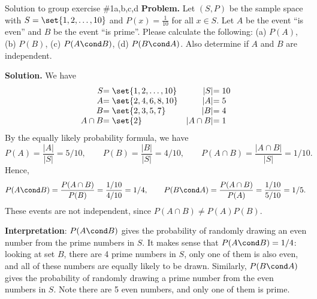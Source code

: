 \documentclass[10pt]{beamer}
\begin{document}
\begin{frame}{Solution to group exercise \#1a,b,c,d}
\footnotesize 
\vspace{-.1cm} 
\textbf{Problem.}  Let $(S,P)$ be the sample space with $S=\set{1,2,\hdots, 10}$ and $P(x) =\frac{1}{10}$ for all $x \in S$.  Let $A$ be the event \enquote{is even} and $B$ be the event \enquote{is prime}.  Please calculate the following: (a) $P(A)$,  (b) $P(B)$, (c) $P(A \cond B)$, (d) $P(B \cond A)$. Also determine if $A$ and $B$ are independent.

\vspace{-.135cm}
\textbf{Solution.}
We have 
\[
\begin{array}{r@{}l r@{}l}
S &= \set{1,2,\hdots, 10} & |S| &= 10 \\
A &= \set{2,4,6,8,10} & |A| &= 5 \\
B &= \set{2,3,5,7} & |B| &= 4 \\
A \cap B &= \set{2} & |A \cap B| &= 1
\end{array}
\]
%
By the equally likely probability formula, we have
 \[ P(A) = \frac{|A|}{|S|} = 5/10, \qquad P(B) = \frac{|B|}{|S|} = 4/10, \qquad P(A \cap B) =  \frac{|A \cap B|}{|S|} = 1/10. \]
Hence,
\[P(A \cond B) = \frac{P(A \cap B)}{P(B)} = \frac{1/10}{4/10} = 1/4, \qquad  P(B \cond A) = \frac{P(A \cap B)}{P(A)} = \frac{1/10}{5/10} = 1/5.\]
These events are not independent, since $P(A \cap B) \neq P(A) P(B).$

%
\vspace{-.135cm} 
\textbf{Interpretation}: $P(A \cond B)$ gives the probability of randomly drawing an even number from the prime numbers in $S$.  It makes sense that $P(A \cond B)=1/4$: looking at set $B$, there are 4 prime numbers in $S$, only one of them is also even, and all of these numbers are equally likely to be drawn.  Similarly, $P(B \cond A)$ gives the probability of randomly drawing a prime number from the even numbers in $S$.  Note there are 5 even numbers, and only one of them is prime. 
\end{frame}
\end{document}
